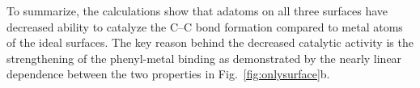 \documentclass[aps,prb,amsmath,amssymb,11pt]{revtex4-1}
\newcommand{\sinfo}{Supporting Information}
\begin{document}
To summarize, the calculations show that adatoms on all three surfaces have decreased ability to catalyze the C--C bond formation compared to metal atoms of the ideal surfaces. 
The key reason behind the decreased catalytic activity is the strengthening of the phenyl-metal binding as demonstrated by the nearly linear dependence between the two properties in Fig.~\ref{fig:onlysurface}b.

\end{document}
